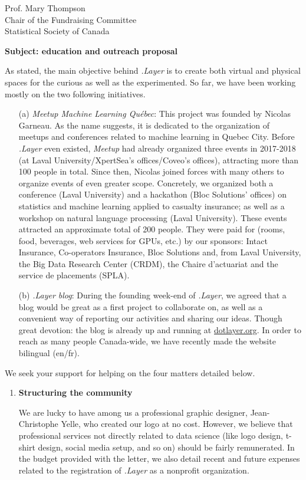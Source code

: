 \documentclass[11pt, a4paper]{letter} %
\begin{document}
\begin{letter}{
	Prof. Mary Thompson\\
	Chair of the Fundraising Committee\\
	Statistical Society of Canada
	
	\bigskip
	\textbf{Subject: education and outreach proposal}%
}
As stated, the main objective behind \emph{.Layer} is to create both virtual and physical spaces for the curious as well as the experimented. So far, we have been working mostly on the two following initiatives.
\begin{enumerate}
	\item[(a)] \emph{Meetup Machine Learning Québec}: This project was founded by Nicolas Garneau. As the name suggests, it is dedicated to the organization of meetups and conferences related to machine learning in Quebec City. Before \emph{.Layer} even existed, \emph{Meetup} had already organized three events in 2017-2018 (at Laval University/XpertSea's offices/Coveo's offices), attracting more than 100 people in total. Since then, Nicolas joined forces with many others to organize events of even greater scope. Concretely, we organized both a conference (Laval University) and a hackathon (Bloc Solutions' offices) on statistics and machine learning applied to casualty insurance; as well as a workshop on natural language processing (Laval University). These events attracted an approximate total of 200 people. They were paid for (rooms, food, beverages, web services for GPUs, etc.) by our sponsors: Intact Insurance, Co-operators Insurance, Bloc Solutions and, from Laval University, the Big Data Research Center (CRDM), the Chaire d'actuariat and the service de placements (SPLA).
	\item[(b)] \emph{.Layer blog}: During the founding week-end of \emph{.Layer}, we agreed that a blog would be great as a first project to collaborate on, as well as a convenient way of reporting our activities and sharing our ideas. Though great devotion: the blog is already up and running at \href{https://www.dotlayer.org/}{dotlayer.org}. In order to reach as many people Canada-wide, we have recently made the website bilingual (en/fr).
\end{enumerate}

We seek your support for helping on the four matters detailed below.

\begin{enumerate}
	\item \textbf{Structuring the community}
	
	\quad We are lucky to have among us a professional graphic designer, Jean-Christophe Yelle, who created our logo at no cost. However, we believe that professional services not directly related to data science (like logo design, t-shirt design, social media setup, and so on) should be fairly remunerated. In the budget provided with the letter, we also detail recent and future expenses related to the registration of \emph{.Layer} as a nonprofit organization.
	

\end{enumerate}
\end{letter}
\end{document}
